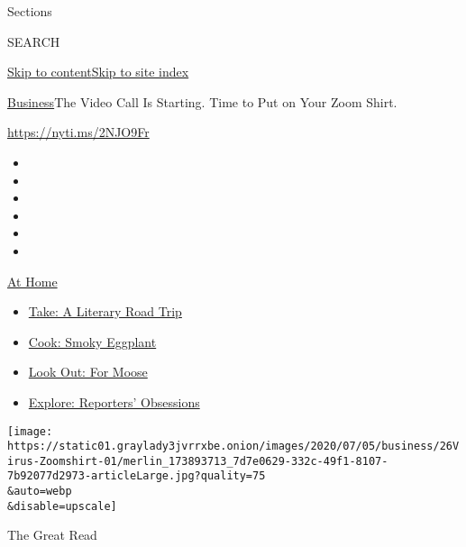 Sections

SEARCH

\protect\hyperlink{site-content}{Skip to
content}\protect\hyperlink{site-index}{Skip to site index}

\href{/section/business}{Business}\textbar{}The Video Call Is Starting.
Time to Put on Your Zoom Shirt.

\url{https://nyti.ms/2NJO9Fr}

\begin{itemize}
\item
\item
\item
\item
\item
\item
\end{itemize}

\href{https://www.nytimes3xbfgragh.onion/spotlight/at-home?action=click\&pgtype=Article\&state=default\&region=TOP_BANNER\&context=at_home_menu}{At
Home}

\begin{itemize}
\tightlist
\item
  \href{https://www.nytimes3xbfgragh.onion/2020/07/28/books/time-for-a-literary-road-trip.html?action=click\&pgtype=Article\&state=default\&region=TOP_BANNER\&context=at_home_menu}{Take:
  A Literary Road Trip}
\item
  \href{https://www.nytimes3xbfgragh.onion/2020/07/29/magazine/bored-with-your-home-cooking-some-smoky-eggplant-will-fix-that.html?action=click\&pgtype=Article\&state=default\&region=TOP_BANNER\&context=at_home_menu}{Cook:
  Smoky Eggplant}
\item
  \href{https://www.nytimes3xbfgragh.onion/2020/07/27/travel/moose-michigan-isle-royale.html?action=click\&pgtype=Article\&state=default\&region=TOP_BANNER\&context=at_home_menu}{Look
  Out: For Moose}
\item
  \href{https://www.nytimes3xbfgragh.onion/interactive/2020/at-home/even-more-reporters-editors-diaries-lists-recommendations.html?action=click\&pgtype=Article\&state=default\&region=TOP_BANNER\&context=at_home_menu}{Explore:
  Reporters' Obsessions}
\end{itemize}

\texttt{[image: https://static01.graylady3jvrrxbe.onion/images/2020/07/05/business/26Virus-Zoomshirt-01/merlin\_173893713\_7d7e0629-332c-49f1-8107-7b92077d2973-articleLarge.jpg?quality=75\\\&auto=webp\\\&disable=upscale]}

The Great Read

